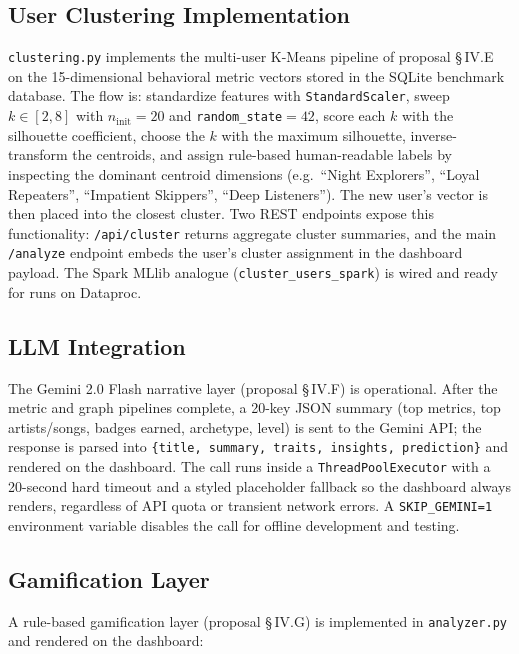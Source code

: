 \documentclass[conference]{IEEEtran}
\begin{document}
\subsection{User Clustering Implementation}

\texttt{clustering.py} implements the multi-user K-Means pipeline of proposal \S\,IV.E on the 15-dimensional behavioral metric vectors stored in the SQLite benchmark database. The flow is: standardize features with \texttt{StandardScaler}, sweep $k \in [2, 8]$ with $n_{\text{init}}{=}20$ and \texttt{random\_state}${=}42$, score each $k$ with the silhouette coefficient, choose the $k$ with the maximum silhouette, inverse-transform the centroids, and assign rule-based human-readable labels by inspecting the dominant centroid dimensions (e.g.\ ``Night Explorers'', ``Loyal Repeaters'', ``Impatient Skippers'', ``Deep Listeners''). The new user's vector is then placed into the closest cluster. Two REST endpoints expose this functionality: \texttt{/api/cluster} returns aggregate cluster summaries, and the main \texttt{/analyze} endpoint embeds the user's cluster assignment in the dashboard payload. The Spark MLlib analogue (\texttt{cluster\_users\_spark}) is wired and ready for runs on Dataproc.

\subsection{LLM Integration}

The Gemini 2.0 Flash narrative layer (proposal \S\,IV.F) is operational. After the metric and graph pipelines complete, a 20-key JSON summary (top metrics, top artists/songs, badges earned, archetype, level) is sent to the Gemini API; the response is parsed into \texttt{\{title, summary, traits, insights, prediction\}} and rendered on the dashboard. The call runs inside a \texttt{ThreadPoolExecutor} with a 20-second hard timeout and a styled placeholder fallback so the dashboard always renders, regardless of API quota or transient network errors. A \texttt{SKIP\_GEMINI=1} environment variable disables the call for offline development and testing.

\subsection{Gamification Layer}

A rule-based gamification layer (proposal \S\,IV.G) is implemented in \texttt{analyzer.py} and rendered on the dashboard:
\end{document}
